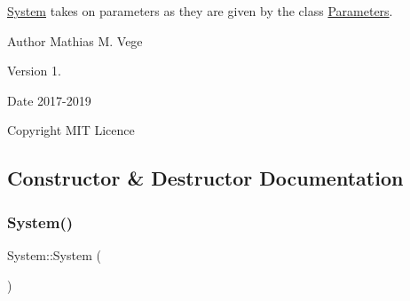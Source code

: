 \mbox{\hyperlink{class_system}{System}} takes on parameters as they are given by the class \mbox{\hyperlink{class_parameters}{Parameters}}.

\begin{DoxyAuthor}{Author}
Mathias M. Vege 
\end{DoxyAuthor}
\begin{DoxyVersion}{Version}
1. 
\end{DoxyVersion}
\begin{DoxyDate}{Date}
2017-\/2019 
\end{DoxyDate}
\begin{DoxyCopyright}{Copyright}
M\+IT Licence 
\end{DoxyCopyright}


\subsection{Constructor \& Destructor Documentation}
\mbox{\label{class_system_ae317936c9bcf1374d61745572e0f2f8a}} 
\subsubsection{\texorpdfstring{System()}{System()}}
{\footnotesize\ttfamily System\+::\+System (\begin{DoxyParamCaption}{ }\end{DoxyParamCaption})}

